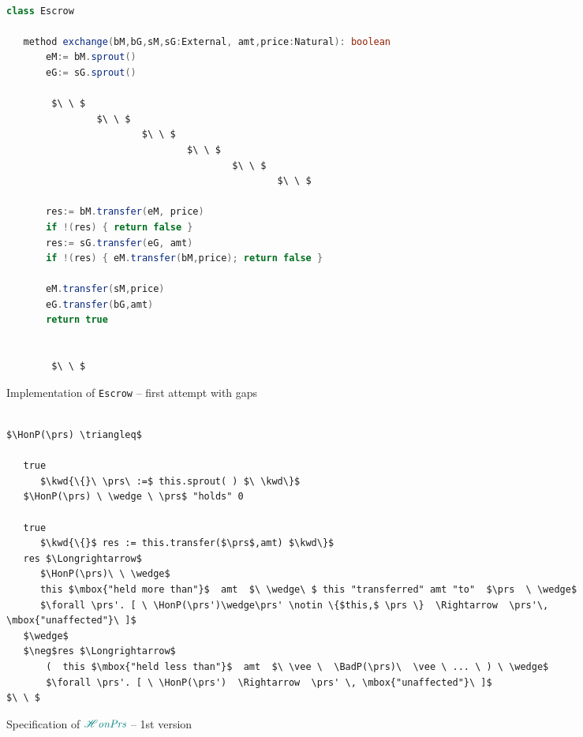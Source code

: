 \documentclass[acmsmall,review,anonymous,screen]{acmart}\settopmatter{printfolios=true,printacmref=false}
\begin{document}
 \begin{figure}[t]
\begin{lstlisting}[mathescape=true, language=Java, frame=lines]

class Escrow 
     
   method exchange(bM,bG,sM,sG:External, amt,price:Natural): boolean 
       eM:= bM.sprout()
       eG:= sG.sprout()
       
        $\ \ $
                $\ \ $
                        $\ \ $
                                $\ \ $
                                        $\ \ $
                                                $\ \ $
                                                  
       res:= bM.transfer(eM, price)
       if !(res) { return false }
       res:= sG.transfer(eG, amt)
       if !(res) { eM.transfer(bM,price); return false }
       
       eM.transfer(sM,price)
       eG.transfer(bG,amt)
       return true 
       

        $\ \ $
\end{lstlisting}
\caption{Implementation of \texttt{Escrow} -- first attempt with gaps}
\label{fig:EscrowSpec}
 \end{figure}
 

 \begin{figure}[t]
\begin{lstlisting}[mathescape=true, language=Chainmail,frame=lines]

$\HonP(\prs) \triangleq$   
   
   true
      $\kwd{\{}\ \prs\ :=$ this.sprout( ) $\ \kwd\}$
   $\HonP(\prs) \ \wedge \ \prs$ "holds" 0  
  
   true
      $\kwd{\{}$ res := this.transfer($\prs$,amt) $\kwd\}$
   res $\Longrightarrow$
      $\HonP(\prs)\ \ \wedge$ 
      this $\mbox{"held more than"}$  amt  $\ \wedge\ $ this "transferred" amt "to"  $\prs  \ \wedge$     
      $\forall \prs'. [ \ \HonP(\prs')\wedge\prs' \notin \{$this,$ \prs \}  \Rightarrow  \prs'\, \mbox{"unaffected"}\ ]$                 
   $\wedge$
   $\neg$res $\Longrightarrow$
       (  this $\mbox{"held less than"}$  amt  $\ \vee \  \BadP(\prs)\  \vee \ ... \ ) \ \wedge$
       $\forall \prs'. [ \ \HonP(\prs')  \Rightarrow  \prs' \, \mbox{"unaffected"}\ ]$ 
$\ \ $
\end{lstlisting}
\caption{Specification of $\textcolor{teal}{{\mathcal H}{\textit{onPrs}}}$  -- 1st version}
\label{fig:PurseSpecInco}
 \end{figure}
\end{document}
